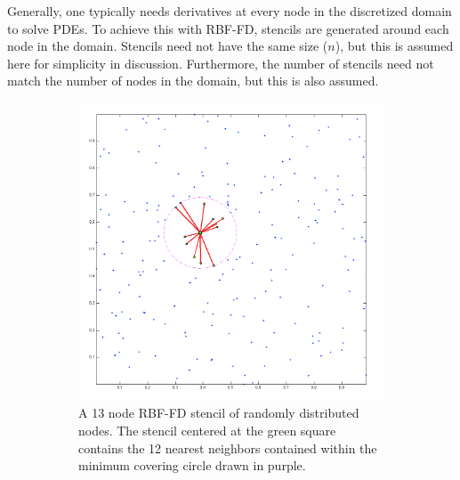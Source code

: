 \documentclass[11pt]{report}
\begin{document}
{Generally, one typically needs derivatives at every node in the discretized domain to solve PDEs. To achieve this with RBF-FD, stencils are generated around each node in the domain. Stencils need not have the same size ($n$), but this is assumed here for simplicity in discussion. Furthermore, the number of stencils need not match the number of nodes in the domain, but this is also assumed. 


\begin{figure}[htbp]
	\centering
	\begin{subfigure}[m]{0.6\textwidth}
		\centering
		\includegraphics[width=1.0\textwidth]{../figures/chapter2/preview_stencils_example.png}
		\caption{A 13 node RBF-FD stencil of randomly distributed nodes. The stencil centered at the green square contains the 12 nearest neighbors contained within the minimum covering circle drawn in purple.}
		\label{fig:stencil_example_random}
	\end{subfigure}
	\begin{subfigure}[m]{0.35\textwidth}
		\centering

\end{subfigure}
\end{figure}}
\end{document}
